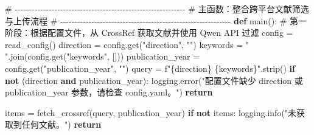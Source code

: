 \documentclass[
  letterpaper,
  DIV=11,
  numbers=noendperiod]{scrreprt}
\newenvironment{Shaded}{\begin{snugshade}}{\end{snugshade}}
\newcommand{\CommentTok}[1]{\textcolor[rgb]{0.37,0.37,0.37}{#1}}
\newcommand{\ControlFlowTok}[1]{\textcolor[rgb]{0.00,0.23,0.31}{\textbf{#1}}}
\newcommand{\KeywordTok}[1]{\textcolor[rgb]{0.00,0.23,0.31}{\textbf{#1}}}
\newcommand{\NormalTok}[1]{\textcolor[rgb]{0.00,0.23,0.31}{#1}}
\newcommand{\OperatorTok}[1]{\textcolor[rgb]{0.37,0.37,0.37}{#1}}
\newcommand{\SpecialCharTok}[1]{\textcolor[rgb]{0.37,0.37,0.37}{#1}}
\newcommand{\SpecialStringTok}[1]{\textcolor[rgb]{0.13,0.47,0.30}{#1}}
\newcommand{\StringTok}[1]{\textcolor[rgb]{0.13,0.47,0.30}{#1}}
\begin{document}
\begin{Shaded}
\begin{Highlighting}[]
\CommentTok{\# {-}{-}{-}{-}{-}{-}{-}{-}{-}{-}{-}{-}{-}{-}{-}{-}{-}{-}{-}{-}{-}{-}{-}{-}{-}{-}{-}{-}{-}{-}{-}{-}{-}{-}{-}{-}{-}{-}{-}{-}{-}{-}{-}{-}{-}{-}{-}{-}{-}{-}{-}{-}{-}{-}{-}{-}{-}{-}{-}{-}}
\CommentTok{\# 主函数：整合跨平台文献筛选与上传流程}
\CommentTok{\# {-}{-}{-}{-}{-}{-}{-}{-}{-}{-}{-}{-}{-}{-}{-}{-}{-}{-}{-}{-}{-}{-}{-}{-}{-}{-}{-}{-}{-}{-}{-}{-}{-}{-}{-}{-}{-}{-}{-}{-}{-}{-}{-}{-}{-}{-}{-}{-}{-}{-}{-}{-}{-}{-}{-}{-}{-}{-}{-}{-}}
\KeywordTok{def}\NormalTok{ main():}
    \CommentTok{\# 第一阶段：根据配置文件，从 CrossRef 获取文献并使用 Qwen API 过滤}
\NormalTok{    config }\OperatorTok{=}\NormalTok{ read\_config()}
\NormalTok{    direction }\OperatorTok{=}\NormalTok{ config.get(}\StringTok{"direction"}\NormalTok{, }\StringTok{""}\NormalTok{)}
\NormalTok{    keywords }\OperatorTok{=} \StringTok{" "}\NormalTok{.join(config.get(}\StringTok{"keywords"}\NormalTok{, []))}
\NormalTok{    publication\_year }\OperatorTok{=}\NormalTok{ config.get(}\StringTok{"publication\_year"}\NormalTok{, }\StringTok{""}\NormalTok{)}
\NormalTok{    query }\OperatorTok{=} \SpecialStringTok{f"}\SpecialCharTok{\{}\NormalTok{direction}\SpecialCharTok{\}}\SpecialStringTok{ }\SpecialCharTok{\{}\NormalTok{keywords}\SpecialCharTok{\}}\SpecialStringTok{"}\NormalTok{.strip()}
    \ControlFlowTok{if} \KeywordTok{not}\NormalTok{ (direction }\KeywordTok{and}\NormalTok{ publication\_year):}
\NormalTok{        logging.error(}\StringTok{"配置文件缺少 \textquotesingle{}direction\textquotesingle{} 或 \textquotesingle{}publication\_year\textquotesingle{} 参数，请检查 config.yaml。"}\NormalTok{)}
        \ControlFlowTok{return}

\NormalTok{    items }\OperatorTok{=}\NormalTok{ fetch\_crossref(query, publication\_year)}
    \ControlFlowTok{if} \KeywordTok{not}\NormalTok{ items:}
\NormalTok{        logging.info(}\StringTok{"未获取到任何文献。"}\NormalTok{)}
        \ControlFlowTok{return}


\end{Highlighting}
\end{Shaded}
\end{document}
